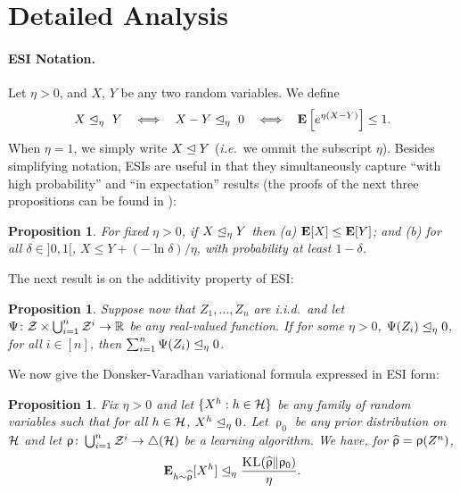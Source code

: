 \documentclass{article}
\newcommand{\ro}{\uprho}
\newcommand{\hro}{\what{\uprho}}
\newtheorem{proposition}[theorem]{Proposition}
\begin{document}
\section{Detailed Analysis}
\paragraph{ESI Notation.} Let $\eta>0$, and $X$, $Y$ be any two random variables. We define
	\begin{align}\label{eq:esi}
	X \stochleq_{\eta} \  Y  \ \ \iff \ \ X -Y\stochleq_{\eta} \  0  \ \ \iff \ \ \E \left[e^{\eta (X- Y)} \right] \leq 1.
	\end{align}
When $\eta=1$, we simply write $X \trianglelefteq Y$ (\emph{i.e.}~we ommit the subscript $\eta$). Besides simplifying notation, ESIs are useful in that they  simultaneously capture ``with high probability'' and ``in expectation'' results (the proofs of the next three propositions can be found in \citep{mhammedi2019pac}):
\begin{proposition} \label{prop:drop} 
	For fixed $\eta > 0$, if $X \trianglelefteq_{\eta} Y$ then (a) $\mathbf{E} [X] \leq \mathbf{E}[Y]$; and (b) for all $\delta \in]0,1[$, $X\leq Y + (-\ln \delta)/ \eta$, with probability at least $1-\delta$.
\end{proposition}
The next result is on the additivity property of ESI: 
\begin{proposition}\label{prop:Trans} 
 Suppose now that $Z_1, \ldots, Z_n$ are i.i.d.~and let  $\Psi \colon \mathcal Z \times \bigcup_{i=1}^n \mathcal Z^i \rightarrow {\mathbb R}$ be any real-valued function. If for some $\eta>0$, $\Psi(Z_i) \trianglelefteq_\eta 0$, for all $i \in [n]$, then $\sum_{i=1}^n \Psi(Z_i) \trianglelefteq_{\eta} 0$.
\end{proposition}
We now give the Donsker-Varadhan variational formula expressed in ESI form: \begin{proposition} \label{prop:donsker}
	Fix $\eta > 0$ and let $\{X^h: h \in \mathcal H\}$ be any family of random variables such that for all $h \in \mathcal H$, $X^h \trianglelefteq_{\eta} 0$. Let $\ro_0$ be any prior distribution on $\mathcal H$ and let $\ro \colon \bigcup_{i=1}^n \cZ^{i} \rightarrow \triangle(\cH)$ be a learning algorithm.  We have, for $\hro = \ro(Z^n)$,
	\begin{align} \E_{h \sim \hro}[X^{h}] \stochleq_{\eta} \frac{\KL(\hro \| \ro_0)}{\eta}. \label{eq:PACBayes} \end{align} 
\end{proposition}
\end{document}

